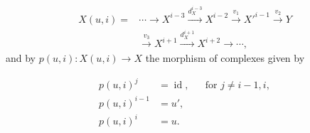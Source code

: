 \begin{equation}
\begin{aligned}
X(u,i)={}&\cdots\longrightarrow X^{i-3}
\xrightarrow{d_X^{i-3}}X^{i-2}
\xrightarrow{v_1}X'^{i-1}
\xrightarrow{v_2}Y\\
&\xrightarrow{v_3}X^{i+1}
\xrightarrow{d_X^{i+1}}X^{i+2}\longrightarrow\cdots,
\end{aligned}
\tag{2.1.1.2}
\end{equation}
and by $p(u,i)\colon X(u,i)\longrightarrow X$ the morphism of
complexes given by

\begin{equation}
\begin{aligned}
p(u,i)^j&=\operatorname{id},
  &&\text{for }j\neq i-1,i,\\
p(u,i)^{i-1}&=u',\\
p(u,i)^i&=u.
\end{aligned}
\tag{2.1.1.3}
\end{equation}
\endgroup

